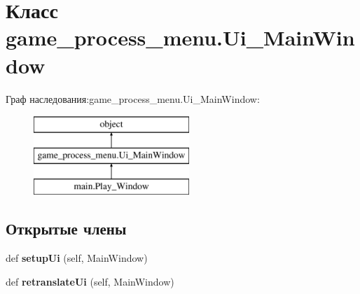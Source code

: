 \hypertarget{classgame__process__menu_1_1_ui___main_window}{}\section{Класс game\+\_\+process\+\_\+menu.\+Ui\+\_\+\+Main\+Window}
\label{classgame__process__menu_1_1_ui___main_window}
Граф наследования\+:game\+\_\+process\+\_\+menu.\+Ui\+\_\+\+Main\+Window\+:\begin{figure}[H]
\begin{center}
\leavevmode
\includegraphics[height=3.000000cm]{classgame__process__menu_1_1_ui___main_window}
\end{center}
\end{figure}
\subsection*{Открытые члены}
\begin{DoxyCompactItemize}
\item 
\mbox{\label{classgame__process__menu_1_1_ui___main_window_ace7f15254d19aa7b9b8823314a39353b}} 
def {\bfseries setup\+Ui} (self, Main\+Window)
\item 
\mbox{\label{classgame__process__menu_1_1_ui___main_window_aa85a12e6d10322dfc7a6ace29d3844d4}} 
def {\bfseries retranslate\+Ui} (self, Main\+Window)
\end{DoxyCompactItemize}
